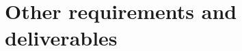 \documentclass[Main]{subfiles}
\begin{document}
\chapter{Other requirements and deliverables}






\end{document}
